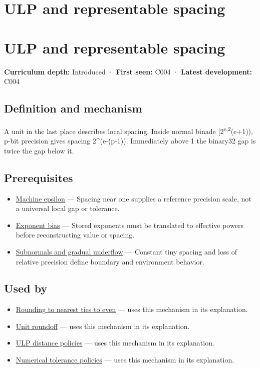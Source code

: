 \hypertarget{appendix-14bab4cab9d4}{}
\section*{ULP and representable spacing}
\section{ULP and representable spacing}\label{ulp-and-representable-spacing}

\textbf{Curriculum depth:} Introduced · \textbf{First seen:} C004 · \textbf{Latest development:} C004

\subsection{Definition and mechanism}\label{definition-and-mechanism}

A unit in the last place describes local spacing. Inside normal binade {[}2\textsuperscript{e,2}(e+1)), p-bit precision gives spacing 2\^{}(e-(p-1)). Immediately above 1 the binary32 gap is twice the gap below it.

\subsection{Prerequisites}\label{prerequisites}

\begin{itemize}
\tightlist
\item
  \hyperref[appendix-390ea641da54]{Machine epsilon} --- Spacing near one supplies a reference precision scale, not a universal local gap or tolerance.
\item
  \hyperref[appendix-2fae058c82e1]{Exponent bias} --- Stored exponents must be translated to effective powers before reconstructing value or spacing.
\item
  \hyperref[appendix-00a6e044c437]{Subnormals and gradual underflow} --- Constant tiny spacing and loss of relative precision define boundary and environment behavior.
\end{itemize}

\subsection{Used by}\label{used-by}

\begin{itemize}
\tightlist
\item
  \hyperref[appendix-614afe1de592]{Rounding to nearest ties to even} --- uses this mechanism in its explanation.
\item
  \hyperref[appendix-bc44f7b42f42]{Unit roundoff} --- uses this mechanism in its explanation.
\item
  \hyperref[appendix-deca299ae4b8]{ULP distance policies} --- uses this mechanism in its explanation.
\item
  \hyperref[appendix-0ec599f8ba27]{Numerical tolerance policies} --- uses this mechanism in its explanation.
\end{itemize}


